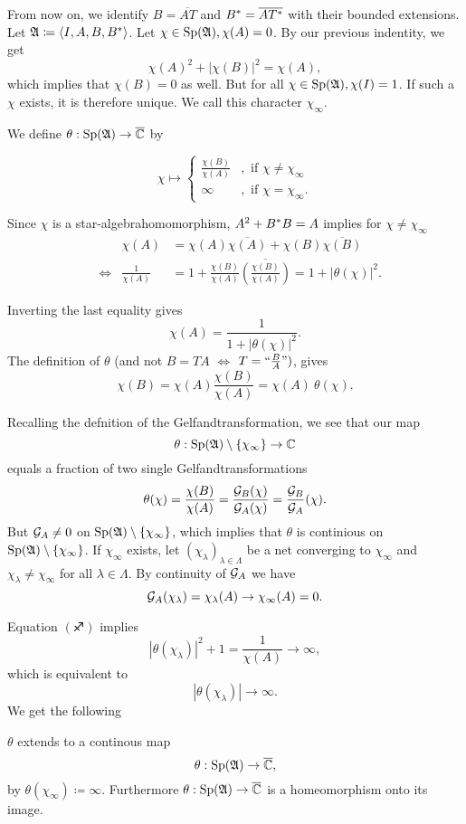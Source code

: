 \documentclass[a4paper,10pt]{article}
\begin{document}
From now on, we identify $B=\overline{AT}$ and $B^{*} =\overline{AT^{*}}$  with their bounded extensions.
Let $\mathfrak{A} \coloneqq \left\langle I, A, B , B^{*} \right\rangle$. Let $ \chi \in \operatorname{Sp} (\mathfrak{A}), \chi(A) =0$. By our previous indentity, we get
\[
 \chi(A)^2 + |\chi(B)|^2 = \chi(A),
\]
which implies that $\chi(B) =0$ as well. But for all $\chi \in \operatorname{Sp} (\mathfrak{A}), \chi(I)=1$. If such a $\chi$ exists, it is therefore unique. We call this character $\chi_\infty$.

We define $\theta : \operatorname{Sp} (\mathfrak{A}) \to \overline{\mathbb{C}}$ by

 \[
 \chi \mapsto 
  \begin{cases}
    \frac{\chi(B)}{\chi(A)} &, \text{ if }\chi \neq \chi_\infty\\
    \infty &, \text{ if } \chi = \chi_\infty.
    \end{cases}
 \]
 
 Since $\chi$ is a star-algebrahomomorphism, $A^2 + B^{*} B = A$ implies for $\chi \neq \chi_\infty$
 \begin{align*}
  &  & \chi(A) &= \chi(A) \overline{\chi(A)} + \chi(B) \overline{\chi(B)} \\
  &\Leftrightarrow& \frac{1}{\chi(A)} &= 1 + \frac{\chi(B)}{\chi(A)} \overline{\left( \frac{\chi(B)}{\chi(A)} \right)} = 1 + | \theta(\chi)|^2. 
 \end{align*}

Inverting the last equality gives
\[
 \chi(A) = \frac{1}{1 + |\theta (\chi)|^2} \tag{\blankone}.
\]
The definition of $\theta$ (and not $B= TA$ $\Leftrightarrow$ $T = `` \frac{B}{A} ")$, gives
\[
 \chi(B) = \chi(A) \frac{\chi(B)}{\chi(A)}= \chi(A)~ \theta(\chi) \tag{\blanktwo}.
\]

Recalling the defnition of the Gelfandtransformation, we see that our map
\[
 \theta : \operatorname{Sp}(\mathfrak{A}) \setminus \{\chi_\infty\} \to \mathbb{C}
\]
equals a fraction of two single Gelfandtransformations
\[
 \theta(\chi) = \frac{\chi(B)}{\chi(A)} = \frac{\mathcal{G}_B (\chi)}{\mathcal{G}_A (\chi)}= \frac{\mathcal{G}_B}{\mathcal{G}_A}(\chi).
\]
But $\mathcal{G}_A \neq 0$ on $\operatorname{Sp}(\mathfrak{A}) \setminus \{\chi_\infty\}$, which implies that $\theta$ is continious on $\operatorname{Sp}(\mathfrak{A}) \setminus \{\chi_\infty\}$.
If $\chi_\infty$ exists, let $ \left( \chi_\lambda \right) _{\lambda \in \Lambda}$ be a net converging to $\chi_\infty$ and $\chi_\lambda \neq \chi_\infty$ for all $\lambda \in \Lambda$. By continuity of $\mathcal{G}_A$ we have
\[
 \mathcal{G}_A (\chi_\lambda) = \chi_\lambda (A) \to \chi_\infty (A) = 0.
\]

Equation $(\sagittarius)$ implies
\[
 | \theta( \chi_\lambda ) | ^2  + 1 = \frac{1}{\chi(A)} \to \infty,
\]
which is equivalent to 
\[
 | \theta (\chi_\lambda ) | \to \infty.
\]
We get the following 
\begin{lem}
$\theta$ extends to a continous map
\[
 \theta : \operatorname{Sp}(\mathfrak{A}) \to \overline{\mathbb{C}},
\]
by $\theta (\chi_\infty) \coloneqq \infty$.
Furthermore $\theta : \operatorname{Sp} (\mathfrak{A}) \to \overline{\mathbb{C}}$ is a homeomorphism onto its image.
\end{lem}
\end{document}
